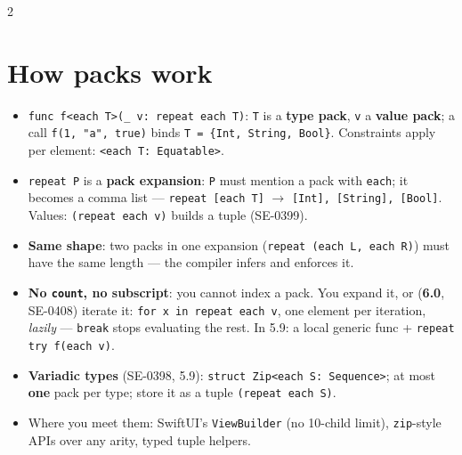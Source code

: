 \documentclass[8pt]{extarticle}
\begin{document}


\begin{multicols}{2}
\raggedright

\section{How packs work}
\begin{itemize}
  \item \texttt{func f<each T>(\_ v: repeat each T)}: \texttt{T} is a
        \textbf{type pack}, \texttt{v} a \textbf{value pack}; a call
        \texttt{f(1, "a", true)} binds \texttt{T = \{Int, String, Bool\}}.
        Constraints apply per element: \texttt{<each T: Equatable>}.
  \item \texttt{repeat P} is a \textbf{pack expansion}: \texttt{P} must mention a
        pack with \texttt{each}; it becomes a comma list —
        \texttt{repeat [each T]} $\to$ \texttt{[Int], [String], [Bool]}.
        Values: \texttt{(repeat each v)} builds a tuple (SE-0399).
  \item \textbf{Same shape}: two packs in one expansion
        (\texttt{repeat (each L, each R)}) must have the same length — the
        compiler infers and enforces it.
  \item \textbf{No \texttt{count}, no subscript}: you cannot index a pack. You
        expand it, or (\textbf{6.0}, SE-0408) iterate it: \texttt{for x in repeat
        each v}, one element per iteration, \emph{lazily} — \texttt{break} stops
        evaluating the rest. In 5.9: a local generic func +
        \texttt{repeat try f(each v)}.
  \item \textbf{Variadic types} (SE-0398, 5.9): \texttt{struct Zip<each S:
        Sequence>}; at most \textbf{one} pack per type; store it as a tuple
        \texttt{(repeat each S)}.
  \item Where you meet them: SwiftUI's \texttt{ViewBuilder} (no 10-child
        limit), \texttt{zip}-style APIs over any arity, typed tuple helpers.
\end{itemize}


\end{multicols}
\end{document}
